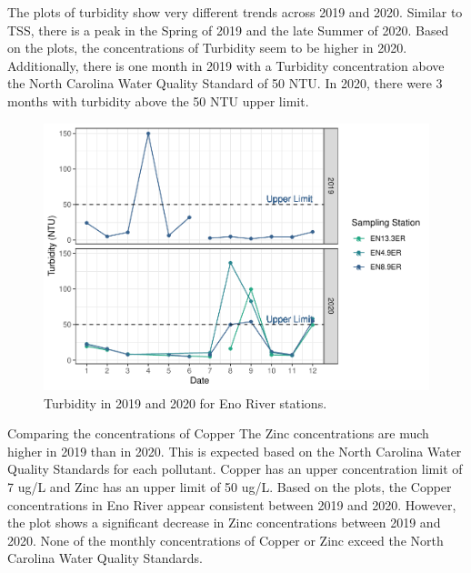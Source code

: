 \documentclass[
  12pt,
]{article}
\begin{document}
The plots of turbidity show very different trends across 2019 and 2020.
Similar to TSS, there is a peak in the Spring of 2019 and the late
Summer of 2020. Based on the plots, the concentrations of Turbidity seem
to be higher in 2020. Additionally, there is one month in 2019 with a
Turbidity concentration above the North Carolina Water Quality Standard
of 50 NTU. In 2020, there were 3 months with turbidity above the 50 NTU
upper limit.

\begin{figure}
\centering
\includegraphics{August_Lindborg_ENV872_Project_files/figure-latex/unnamed-chunk-11-1.pdf}
\caption{Turbidity in 2019 and 2020 for Eno River stations.}
\end{figure}

Comparing the concentrations of Copper The Zinc concentrations are much
higher in 2019 than in 2020. This is expected based on the North
Carolina Water Quality Standards for each pollutant. Copper has an upper
concentration limit of 7 ug/L and Zinc has an upper limit of 50 ug/L.
Based on the plots, the Copper concentrations in Eno River appear
consistent between 2019 and 2020. However, the plot shows a significant
decrease in Zinc concentrations between 2019 and 2020. None of the
monthly concentrations of Copper or Zinc exceed the North Carolina Water
Quality Standards.
\end{document}
